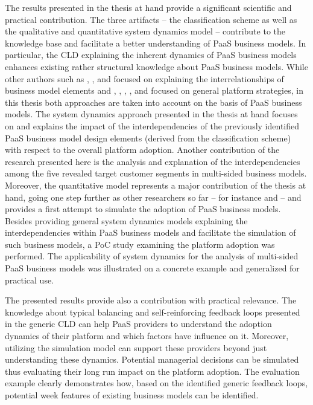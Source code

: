 The results presented in the thesis at hand provide a significant scientific and practical contribution. The three artifacts -- the classification scheme as well as the qualitative and quantitative system dynamics model -- contribute to the knowledge base and facilitate a better understanding of \ac{PaaS} business models. In particular, the \ac{CLD} explaining the inherent dynamics of \ac{PaaS} business models enhances existing rather structural knowledge about \ac{PaaS} business models. While other authors such as \citet{BenLagha2001}, \citet{Klueber2000}, and \citet{Kiani2009} focused on explaining the interrelationships of business model elements and \citet{Cusumano2010}, \citet{Gawer2008}, \citet{Cusumano2002}, \citet{Eisenmann2006}, and \citet{Beimborn2011} focused on general platform strategies, in this thesis both approaches are taken into account on the basis of \ac{PaaS} business models. The system dynamics approach presented in the thesis at hand focuses on and explains the impact of the interdependencies of the previously identified \ac{PaaS} business model design elements (derived from the classification scheme) with respect to the overall platform adoption. Another contribution of the research presented here is the analysis and explanation of the interdependencies among the five revealed target customer segments in multi-sided business models. Moreover, the quantitative model represents a major contribution of the thesis at hand, going one step further as other researchers so far -- for instance \citet{Klueber2000} and \citet{Kiani2009} -- and provides a first attempt to simulate the adoption of \ac{PaaS} business models. Besides providing general system dynamics models explaining the interdependencies within \ac{PaaS} business models and facilitate the simulation of such business models, a \acf{PoC} study examining the platform adoption was performed. The applicability of system dynamics for the analysis of multi-sided \ac{PaaS} business models was illustrated on a concrete example and generalized for practical use.

The presented results provide also a contribution with practical relevance. The knowledge about typical balancing and self-reinforcing feedback loops presented in the generic \ac{CLD} can help \ac{PaaS} providers to understand the adoption dynamics of their platform and which factors have influence on it. Moreover, utilizing the simulation model can support these providers beyond just understanding these dynamics. Potential managerial decisions can be simulated thus evaluating their long run impact on the platform adoption. The evaluation example clearly demonstrates how, based on the identified generic feedback loops, potential week features of existing business models can be identified.


